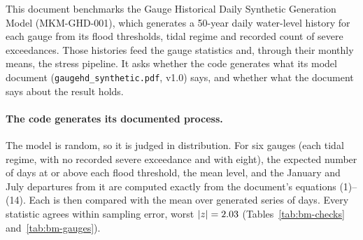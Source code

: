 \documentclass[11pt,a4paper]{article}
\begin{document}
\sloppy

\mkmtitlepage
\mkmlegalpage

\tableofcontents
\clearpage

\mkmexecsummary

This document benchmarks the Gauge Historical Daily Synthetic Generation Model
(MKM-GHD-001), which generates a 50-year daily water-level history for each gauge
from its flood thresholds, tidal regime and recorded count of severe exceedances.
Those histories feed the gauge statistics and, through their monthly means, the
stress pipeline. It asks whether the code generates what its model document
(\texttt{gaugehd\_synthetic.pdf}, v1.0) says, and whether what the document says
about the result holds.

\paragraph{The code generates its documented process.} The model is random, so it is
judged in distribution. For six gauges (each tidal regime, with no recorded severe
exceedance and with eight), the expected number of days at or above each flood
threshold, the mean level, and the January and July departures from it are computed
exactly from the document's equations (1)--(14). Each is then compared with the mean
over \bmReps{} generated series of \bmDays{} days. Every statistic agrees within
sampling error, worst $|z|=2.03$ (Tables~\ref{tab:bm-checks}
and~\ref{tab:bm-gauges}). \bmWolframConfirms
\end{document}
